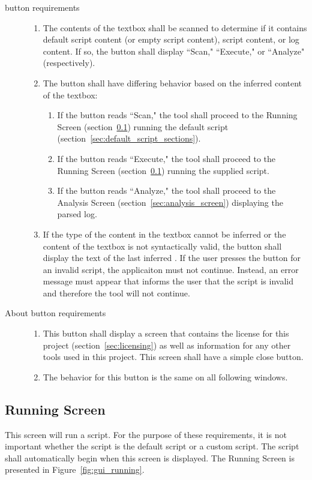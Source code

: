 \begin{description}
\item[ button requirements] \hfill
\begin{enumerate}
\item The contents of the textbox shall be scanned to determine if it contains
default script content (or empty script content), script content, or log
content.  If so, the button shall display ``Scan," ``Execute," or ``Analyze"
(respectively).
\item The button shall have differing behavior based on the inferred content of
the textbox:
\begin{enumerate}
\item If the button reads ``Scan," the tool shall proceed to the Running Screen
(section~\ref{sec:running_screen}) running the default script
(section~\ref{sec:default_script_sections}).
\item If the button reads ``Execute," the tool shall proceed to the Running
Screen (section~\ref{sec:running_screen}) running the supplied script.
\item If the button reads ``Analyze," the tool shall proceed to the Analysis
Screen (section~\ref{sec:analysis_screen}) displaying the parsed log.
\end{enumerate}
\item If the type of the content in the textbox cannot be inferred or the
content of the textbox is not syntactically valid, the button shall display
the text of the last inferred .  If the user presses the
 button for an invalid script, the applicaiton must not continue. 
Instead, an error message must appear that informs the user that the script is
invalid and therefore the tool will not continue.
\end{enumerate}

\item[About button requirements] \hfill
\begin{enumerate}
\item This button shall display a screen that contains the license for this
project (section~\ref{sec:licensing}) as well as information for any other
tools used in this project.  This screen shall have a simple close button.
\item The behavior for this button is the same on all following windows. 
\end{enumerate}
\end{description}

\subsection{Running Screen} \label{sec:running_screen}
This screen will run a script.  For the purpose of these requirements, it is not
important whether the script is the default script or a custom script.  The
script shall automatically begin when this screen is displayed.  The Running 
Screen is presented in Figure~\ref{fig:gui_running}.

